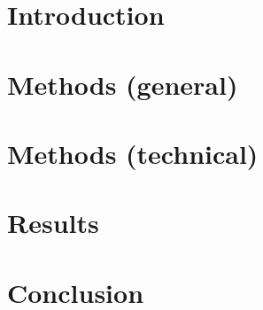 \documentclass{article}
\author{Ron Keizer, Rada Savic, France Mentr\'e}
\begin{document}

\section{Introduction}

\section{Methods (general)}

\section{Methods (technical)}

\section{Results}

\section{Conclusion}
\end{document}

